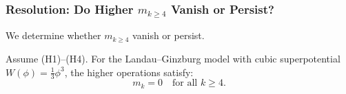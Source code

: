 \subsubsection{Resolution: Do Higher $m_{k \geq 4}$ Vanish or Persist?}

We determine whether $m_{k \geq 4}$ vanish or persist.

\begin{theorem}
Assume \textrm{(H1)--(H4)}.
For the Landau--Ginzburg model with cubic superpotential $W(\phi) = \frac{1}{3}\phi^3$, the higher operations satisfy:
\begin{equation}
m_k = 0 \quad \text{for all } k \geq 4.
\end{equation}
\end{theorem}

